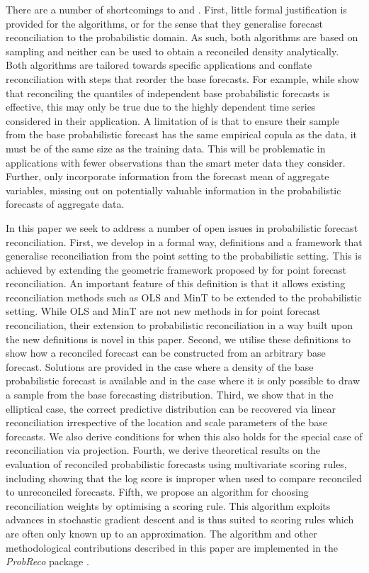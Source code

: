 \documentclass[a4paper,12pt]{article}
\theoremstyle{definition}
\begin{document}
There are a number of shortcomings to \citet{JeoEtAl2019} and \citet{Taieb2017}. First, little formal justification is provided for the algorithms, or for the sense that they generalise forecast reconciliation to the probabilistic domain. As such, both algorithms are based on sampling and neither can be used to obtain a reconciled density analytically. Both algorithms are tailored towards specific applications and conflate reconciliation with steps that reorder the base forecasts. For example, while \citet{JeoEtAl2019} show that {\color{red} reconciling the quantiles of} independent base probabilistic forecasts is effective, this may only be true due to the highly dependent time series considered in their application. A limitation of \citet{Taieb2017} is that to ensure their sample from the base probabilistic forecast has the same empirical copula as the data, it must be of the same size as the training data. This will be problematic in applications with fewer observations than the smart meter data they consider. Further, \citet{Taieb2017} only incorporate information from the forecast mean of aggregate variables, missing out on potentially valuable information in the probabilistic forecasts of aggregate data.

In this paper we seek to address a number of open issues in probabilistic forecast reconciliation. First, we develop in a formal way, definitions and a framework that generalise reconciliation from the point setting to the probabilistic setting. This is achieved by extending the geometric framework proposed by \cite{PanEtAl2020_Geometry} for point forecast reconciliation. {\color{red} An important feature of this definition is that it allows existing reconciliation methods such as OLS and MinT to be extended to the probabilistic setting. While OLS and MinT are not new methods in for point forecast reconciliation, their extension to probabilistic reconciliation in a way built upon the new definitions is novel in this paper.} Second, we utilise these definitions to show how a reconciled forecast can be constructed from an arbitrary base forecast. Solutions are provided in the case where a density of the base probabilistic forecast is available and in the case where it is only possible to draw a sample from the base forecasting distribution. Third, we show that in the elliptical case, the correct predictive distribution can be recovered via linear reconciliation irrespective of the location and scale parameters of the base forecasts. We also derive conditions for when this also holds for the special case of reconciliation via projection. Fourth, we derive theoretical results on the evaluation of reconciled probabilistic forecasts using multivariate scoring rules, including showing that the log score is improper when used to compare reconciled to unreconciled forecasts. Fifth, we propose an algorithm for choosing reconciliation weights by optimising a scoring rule. This algorithm exploits advances in stochastic gradient descent and is thus suited to scoring rules which are often only known up to an approximation. The algorithm and other methodological contributions described in this paper are implemented in the \emph{ProbReco} package \citep{RProbReco}.
\end{document}
